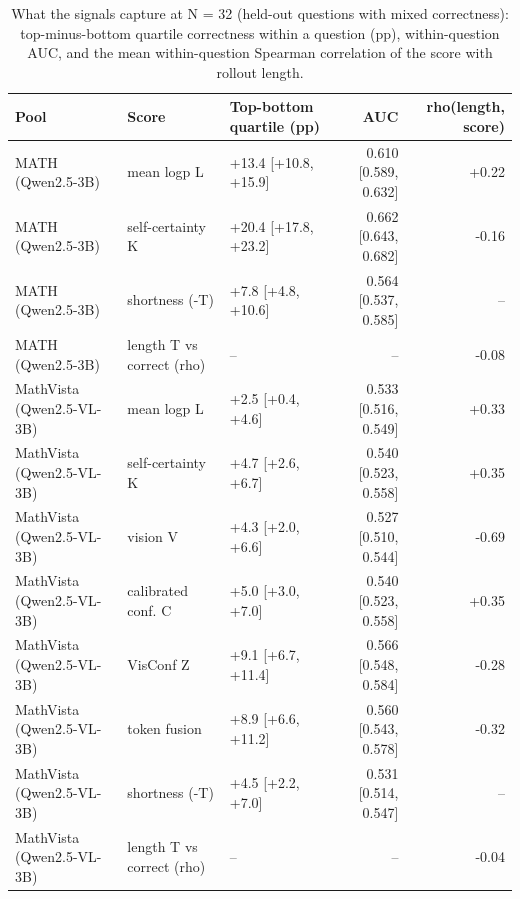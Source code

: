 \begin{table}[t]
\centering
\small
\caption{What the signals capture at N = 32 (held-out questions with mixed correctness): top-minus-bottom quartile correctness within a question (pp), within-question AUC, and the mean within-question Spearman correlation of the score with rollout length.}
\label{tab:T5_signal_discrimination}
\begin{tabular}{lllrr}
\toprule
Pool & Score & Top-bottom quartile (pp) & AUC & rho(length, score) \\
\midrule
MATH (Qwen2.5-3B) & mean logp L & +13.4 [+10.8, +15.9] & 0.610 [0.589, 0.632] & +0.22 \\
MATH (Qwen2.5-3B) & self-certainty K & +20.4 [+17.8, +23.2] & 0.662 [0.643, 0.682] & -0.16 \\
MATH (Qwen2.5-3B) & shortness (-T) & +7.8 [+4.8, +10.6] & 0.564 [0.537, 0.585] & -- \\
MATH (Qwen2.5-3B) & length T vs correct (rho) & -- & -- & -0.08 \\
MathVista (Qwen2.5-VL-3B) & mean logp L & +2.5 [+0.4, +4.6] & 0.533 [0.516, 0.549] & +0.33 \\
MathVista (Qwen2.5-VL-3B) & self-certainty K & +4.7 [+2.6, +6.7] & 0.540 [0.523, 0.558] & +0.35 \\
MathVista (Qwen2.5-VL-3B) & vision V & +4.3 [+2.0, +6.6] & 0.527 [0.510, 0.544] & -0.69 \\
MathVista (Qwen2.5-VL-3B) & calibrated conf. C & +5.0 [+3.0, +7.0] & 0.540 [0.523, 0.558] & +0.35 \\
MathVista (Qwen2.5-VL-3B) & VisConf Z & +9.1 [+6.7, +11.4] & 0.566 [0.548, 0.584] & -0.28 \\
MathVista (Qwen2.5-VL-3B) & token fusion & +8.9 [+6.6, +11.2] & 0.560 [0.543, 0.578] & -0.32 \\
MathVista (Qwen2.5-VL-3B) & shortness (-T) & +4.5 [+2.2, +7.0] & 0.531 [0.514, 0.547] & -- \\
MathVista (Qwen2.5-VL-3B) & length T vs correct (rho) & -- & -- & -0.04 \\
\bottomrule
\end{tabular}
\end{table}
